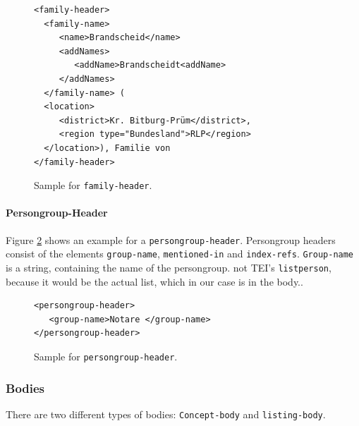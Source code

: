 \begin{figure}[H]
\centering
\begin{verbatim}
<family-header>
  <family-name>
     <name>Brandscheid</name>
     <addNames>
        <addName>Brandscheidt<addName>       
     </addNames>
  </family-name> (
  <location>
     <district>Kr. Bitburg-Prüm</district>, 
     <region type="Bundesland">RLP</region>
  </location>), Familie von 
</family-header>
\end{verbatim}
\label{fig:family-header-xml}
\caption{Sample for \texttt{family-header}.}
\end{figure}

\paragraph{Persongroup-Header}
Figure \ref{fig:persongroup-header-xml} shows an example for a \texttt{persongroup-header}. Persongroup headers consist of the elements \texttt{group-name}, \texttt{mentioned-in} and \texttt{index-refs}. \texttt{Group-name} is a string, containing the name of the persongroup.
not TEI's \texttt{listperson}, because it would be the actual list, which in our case is in the body..

\begin{figure}[H]
\centering
\begin{verbatim}
<persongroup-header>
   <group-name>Notare </group-name>
</persongroup-header>
\end{verbatim}
\label{fig:persongroup-header-xml}
\caption{Sample for \texttt{persongroup-header}.}
\end{figure}

\subsubsection{Bodies}
There are two different types of bodies: \texttt{Concept-body} and \texttt{listing-body}.

